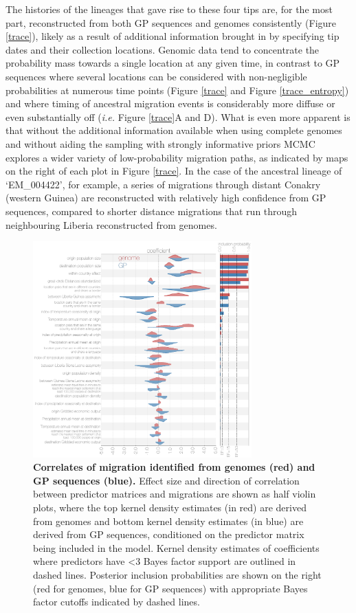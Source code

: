 \documentclass[11pt,oneside,letterpaper]{article}
\begin{document}
The histories of the lineages that gave rise to these four tips are, for the most part, reconstructed from both GP sequences and genomes consistently (Figure \ref{trace}), likely as a result of additional information brought in by specifying tip dates and their collection locations.
Genomic data tend to concentrate the probability mass towards a single location at any given time, in contrast to GP sequences where several locations can be considered with non-negligible probabilities at numerous time points (Figure \ref{trace} and Figure \ref{trace_entropy}) and where timing of ancestral migration events is considerably more diffuse or even substantially off (\textit{i.e.} Figure \ref{trace}A and D).
What is even more apparent is that without the additional information available when using complete genomes and without aiding the sampling with strongly informative priors MCMC explores a wider variety of low-probability migration paths, as indicated by maps on the right of each plot in Figure \ref{trace}.
In the case of the ancestral lineage of `EM\_004422', for example, a series of migrations through distant Conakry (western Guinea) are reconstructed with relatively high confidence from GP sequences, compared to shorter distance migrations that run through neighbouring Liberia reconstructed from genomes.

\begin{figure}[ht]
 \centering
	\includegraphics[width=0.75\textwidth]{figures/fig4_glm.png}
	\caption{\textbf{Correlates of migration identified from genomes (red) and GP sequences (blue).}
  Effect size and direction of correlation between predictor matrices and migrations are shown as half violin plots, where the top kernel density estimates (in red) are derived from genomes and bottom kernel density estimates (in blue) are derived from GP sequences, conditioned on the predictor matrix being included in the model.
  Kernel density estimates of coefficients where predictors have <3 Bayes factor support are outlined in dashed lines.
  Posterior inclusion probabilities are shown on the right (red for genomes, blue for GP sequences) with appropriate Bayes factor cutoffs indicated by dashed lines.
	}
	\label{glm}
\end{figure}
\end{document}
